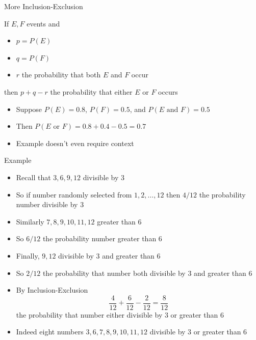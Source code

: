 \documentclass{beamer}
\theoremstyle{definition}
\begin{document}
\begin{frame}{More Inclusion-Exclusion}
\begin{theorem}
If $E,F$ events and
\begin{itemize}
\item $p=P\left(E\right)$
\item $q=P\left(F\right)$
\item $r$ the probability that \alert{both} $E$ and $F$ occur
\end{itemize}
then $p+q-r$ the probability that \alert{either} $E$ or $F$ occurs
\end{theorem}
\begin{example}[Exercise 11]
\begin{itemize}
\item Suppose $P\left(E\right)=0.8$,
$P\left(F\right)=0.5$, and $P\left(\text{$E$ and $F$}\right)=0.5$
\item Then $P\left(\text{$E$ or $F$}\right)
=0.8+0.4-0.5=0.7$
\item Example doesn't even require context
\end{itemize}
\end{example}
\end{frame}

\begin{frame}{Example}
\begin{itemize}
\item Recall that $3,6,9,12$ divisible by $3$
\item So if number randomly selected from
$1,2,\ldots,12$ then $4/12$
the probability number divisible by $3$
\item Similarly $7,8,9,10,11,12$ greater than $6$
\item So $6/12$ the probability number
greater than $6$
\item Finally, $9,12$ divisible by $3$ \alert{and}
greater than $6$
\item So $2/12$ the probability that number
both divisible by $3$ and greater than $6$
\item By Inclusion-Exclusion
\[\frac{4}{12}+\frac{6}{12}-\frac{2}{12}=\frac{8}{12}\]
the probability
that number \alert{either} divisible by $3$ or greater than $6$
\item Indeed eight numbers $3,6,7,8,9,10,11,12$ 
divisible by $3$ or greater than $6$
\end{itemize}
\end{frame}
\end{document}

